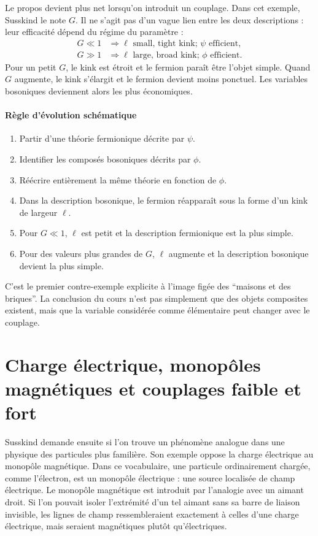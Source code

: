 Le propos devient plus net lorsqu’on introduit un couplage. Dans cet exemple, Susskind le note \(G\). Il ne s’agit pas d’un vague lien entre les deux descriptions : leur efficacité dépend du régime du paramètre :
\begin{align}
G \ll 1
&\Rightarrow
\ell\text{ small, tight kink; }\psi\text{ efficient},\\
G \gg 1
&\Rightarrow
\ell\text{ large, broad kink; }\phi\text{ efficient}.
\end{align}
Pour un petit \(G\), le kink est étroit et le fermion paraît être l’objet simple. Quand \(G\) augmente, le kink s’élargit et le fermion devient moins ponctuel. Les variables bosoniques deviennent alors les plus économiques.

\paragraph{Règle d’évolution schématique}
\begin{enumerate}
\item Partir d’une théorie fermionique décrite par \(\psi\).
\item Identifier les composés bosoniques décrits par \(\phi\).
\item Réécrire entièrement la même théorie en fonction de \(\phi\).
\item Dans la description bosonique, le fermion réapparaît sous la forme d’un kink de largeur \(\ell\).
\item Pour \(G\ll 1\), \(\ell\) est petit et la description fermionique est la plus simple.
\item Pour des valeurs plus grandes de \(G\), \(\ell\) augmente et la description bosonique devient la plus simple.
\end{enumerate}

C’est le premier contre-exemple explicite à l’image figée des ``maisons et des briques''. La conclusion du cours n’est pas simplement que des objets composites existent, mais que la variable considérée comme élémentaire peut changer avec le couplage.

\section{Charge électrique, monopôles magnétiques et couplages faible et fort}

Susskind demande ensuite si l’on trouve un phénomène analogue dans une physique des particules plus familière. Son exemple oppose la charge électrique au monopôle magnétique. Dans ce vocabulaire, une particule ordinairement chargée, comme l’électron, est un monopôle électrique : une source localisée de champ électrique. Le monopôle magnétique est introduit par l’analogie avec un aimant droit. Si l’on pouvait isoler l’extrémité d’un tel aimant sans sa barre de liaison invisible, les lignes de champ ressembleraient exactement à celles d’une charge électrique, mais seraient magnétiques plutôt qu’électriques.

